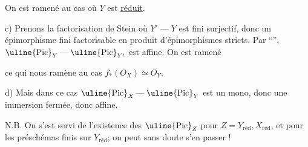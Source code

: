 
On est ramené au cas où $Y$ est \uline{réduit}.

c) Prenons la factorisation de Stein
où $Y'\mathbin{\text{---}}Y$ est fini surjectif, donc un épimorphisme fini factorisable en produit d'épimorphismes stricts. Par ``'', $\uline{\mathrm{Pic}}_Y\mathbin{\text{---}}\uline{\mathrm{Pic}}_{Y'}$ est affine. On est ramené



ce qui nous ramène au cas $f_*(O_X)\simeq O_Y$.

d) Mais dans ce cas  $\uline{\mathrm{Pic}}_X\mathbin{\text{---}}\uline{\mathrm{Pic}}_Y$ est un mono, donc   une immersion fermée, donc affine.


N.B. On s'est servi de l'existence des $\uline{\mathrm{Pic}}_Z$ pour $Z=Y_{\mathrm{réd}},X_{\mathrm{réd}}$, et pour les préschémas finis sur $Y_{\mathrm{réd}}$;  on peut sans doute s'en passer !

